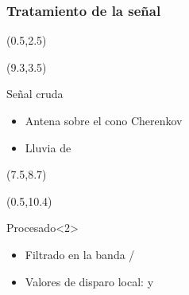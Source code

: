 \begin{frame}
 \frametitle{Tratamiento de la se\~nal}
 \footnotesize
 \begin{textblock}{8}(0.5,2.5)
 \end{textblock}
 \begin{textblock}{6}(9.3,3.5)
  \begin{exampleblock}{Se\~nal cruda}
   \begin{itemize}
    \item Antena sobre el cono Cherenkov
    \item Lluvia de 
   \end{itemize}
  \end{exampleblock}
 \end{textblock}

 \begin{textblock}{8}(7.5,8.7)
 \end{textblock}
 
 \begin{textblock}{6}(0.5,10.4)
  \begin{alertblock}{Procesado}<2>
   \begin{itemize}
    \item Filtrado en la banda /
    \item Valores de disparo local:  y 
   \end{itemize}
  \end{alertblock}
 \end{textblock}
\end{frame}

